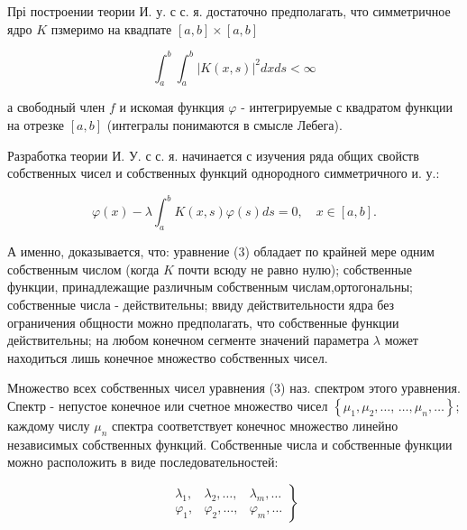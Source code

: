 \documentclass[10pt]{article}
\begin{document}
Прі построении теории И. у. с с. я. достаточно предполагать, что симметричное ядро $K$ пзмеримо на квадпате $[a, b] \times[a, b]$



\[

\int_{a}^{b} \int_{a}^{b}|K(x, s)|^{2} d x d s<\infty

\]



а свободный член $f$ и искомая функция $\varphi$ - интегрируемые с квадратом функции на отрезке $[a, b]$ (интегралы понимаются в смысле Лебега).



Разработка теории И. У. с с. я. начинается с изучения ряда общих свойств собственных чисел и собственных функций однородного симметричного и. у.:



\[

\varphi(x)-\lambda \int_{a}^{b} K(x, s) \varphi(s) d s=0, \quad x \in[a, b] .

\]



А именно, доказывается, что: уравнение (3) обладает по крайней мере одним собственным числом (когда $K$ почти всюду не равно нулю); собственные функции, принадлежащие различным собственным числам,ортогональны; собственные числа - действительны; ввиду действительности ядра без ограничения общности можно предполагать, что собственные функции действительны; на любом конечном сегменте значений параметра $\lambda$ может находиться лишь конечное множество собственных чисел.



Множество всех собственных чисел уравнения (3) наз. спектром этого уравнения. Спектр - непустое конечное или счетное множество чисел $\left\{\mu_{1}, \mu_{2}, \ldots\right.$, $\left.\ldots, \mu_{n}, \ldots\right\}$; каждому числу $\mu_{n}$ спектра соответствует конечнос множество линейно независимых собственных функций. Собственные числа и собственные функции можно расположить в виде последовательностей:



\[

\left.\begin{array}{lll}

\lambda_{1}, & \lambda_{2}, \ldots, & \lambda_{m}, \ldots \\

\varphi_{1}, & \varphi_{2}, \ldots, & \varphi_{m}, \ldots

\end{array}\right\}

\]
\end{document}
